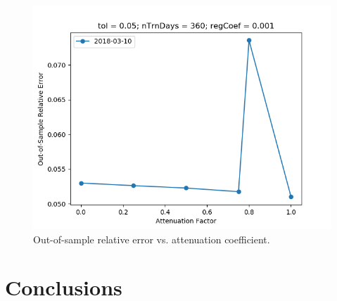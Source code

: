 \documentclass{article}
\begin{document}
\begin{figure}\label{fig:atnFct-sensitivity-oos-error}
\includegraphics[bb=0 0 640 480]{figures/atnFct-sensitivity-oos-error.png}
\caption{Out-of-sample relative error vs. attenuation coefficient.}
\end{figure}

\section{Conclusions}\label{section:conclusions}



\end{document}
